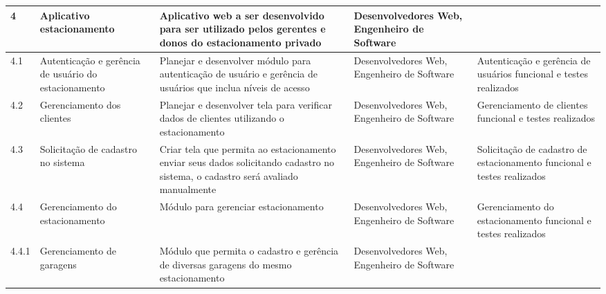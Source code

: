 \begin{landscape}
\begin{longtable}{@{\extracolsep{\fill}}  l  p{}  p{}  p{}  p{}  }
	\midrule
	4           & Aplicativo estacionamento                                 & Aplicativo web a ser desenvolvido para ser utilizado pelos gerentes e donos do estacionamento privado                                                                            & Desenvolvedores Web, Engenheiro de Software                                                      &                                                                                                          \\*
	\midrule
	4.1         & Autenticação e gerência de usuário do estacionamento  & Planejar e desenvolver módulo para autenticação de usuário e gerência de usuários que inclua níveis de acesso                                                             & Desenvolvedores Web, Engenheiro de Software                                                      & Autenticação e gerência de usuários funcional e testes realizados                                    \\*
	\midrule
	4.2         & Gerenciamento dos clientes                                & Planejar e desenvolver tela para verificar dados de clientes utilizando o estacionamento                                                                                         & Desenvolvedores Web, Engenheiro de Software                                                      & Gerenciamento de clientes funcional e testes realizados                                                  \\*
	\midrule
	4.3         & Solicitação de cadastro no sistema                      & Criar tela que permita ao estacionamento enviar seus dados solicitando cadastro no sistema, o cadastro será avaliado manualmente                                                & Desenvolvedores Web, Engenheiro de Software                                                      & Solicitação de cadastro de estacionamento funcional e testes realizados                                \\*
	\midrule
	4.4         & Gerenciamento do estacionamento                           & Módulo para gerenciar estacionamento                                                                                                                                            & Desenvolvedores Web, Engenheiro de Software                                                      & Gerenciamento do estacionamento funcional e testes realizados                                            \\*
	\midrule
	4.4.1       & Gerenciamento de garagens                                 & Módulo que permita o cadastro e gerência de diversas garagens do mesmo estacionamento                                                                                          & Desenvolvedores Web, Engenheiro de Software                                                      &                                                                                                          \\*

\end{longtable}
\end{landscape}
